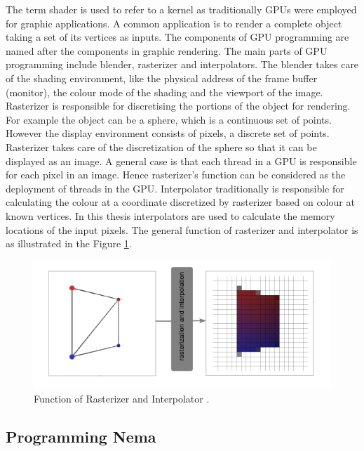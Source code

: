 The term shader is used to refer to a kernel as traditionally GPUs were employed for graphic applications. A common application is to render a complete object taking a set of its vertices as inputs. The components of GPU programming are named after the components in graphic rendering. The main parts of GPU programming include blender, rasterizer and interpolators. The blender takes care of the shading environment, like the physical address of the frame buffer (monitor), the colour mode of the shading and the viewport of the image. Rasterizer is responsible for discretising the portions of the object for rendering. For example the object can be a sphere, which is a continuous set of points. However the display environment consists of pixels, a discrete set of points. Rasterizer takes care of the discretization of the sphere so that it can be displayed as an image. A general case is that each thread in a GPU is responsible for each pixel in an image. Hence rasterizer's function can be considered as the deployment of threads in the GPU. Interpolator traditionally is responsible for calculating the colour at a coordinate discretized by rasterizer based on colour at known vertices. In this thesis interpolators are used to calculate the memory locations of the input pixels. The general function of rasterizer and interpolator is as illustrated in the Figure \ref{fig:rastint}.

\begin{figure}
    \center
    \includegraphics[width=.8\linewidth]{figures/rastint}
    \caption{Function of Rasterizer and Interpolator \cite{Colubri}.}
    \label{fig:rastint}
\end{figure}

\subsection{Programming Nema}
\label{s:gpusw:nema}

